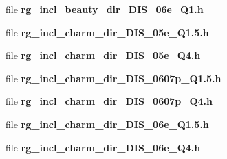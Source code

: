 \begin{CompactItemize}
\item 
file \textbf{rg\_\-incl\_\-beauty\_\-dir\_\-DIS\_\-06e\_\-Q1.h}
\item 
file \textbf{rg\_\-incl\_\-charm\_\-dir\_\-DIS\_\-05e\_\-Q1.5.h}
\item 
file \textbf{rg\_\-incl\_\-charm\_\-dir\_\-DIS\_\-05e\_\-Q4.h}
\item 
file \textbf{rg\_\-incl\_\-charm\_\-dir\_\-DIS\_\-0607p\_\-Q1.5.h}
\item 
file \textbf{rg\_\-incl\_\-charm\_\-dir\_\-DIS\_\-0607p\_\-Q4.h}
\item 
file \textbf{rg\_\-incl\_\-charm\_\-dir\_\-DIS\_\-06e\_\-Q1.5.h}
\item 
file \textbf{rg\_\-incl\_\-charm\_\-dir\_\-DIS\_\-06e\_\-Q4.h}
\end{CompactItemize}
